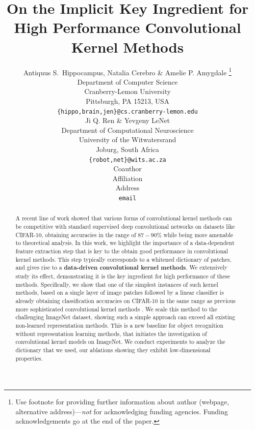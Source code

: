 \documentclass{article} %
\title{On the Implicit  Key Ingredient for High Performance Convolutional Kernel Methods}
\author{Antiquus S.~Hippocampus, Natalia Cerebro \& Amelie P. Amygdale \thanks{ Use footnote for providing further information
about author (webpage, alternative address)---\emph{not} for acknowledging
funding agencies.  Funding acknowledgements go at the end of the paper.} \\
Department of Computer Science\\
Cranberry-Lemon University\\
Pittsburgh, PA 15213, USA \\
\texttt{\{hippo,brain,jen\}@cs.cranberry-lemon.edu} \\
\And
Ji Q. Ren \& Yevgeny LeNet \\
Department of Computational Neuroscience \\
University of the Witwatersrand \\
Joburg, South Africa \\
\texttt{\{robot,net\}@wits.ac.za} \\
\AND
Coauthor \\
Affiliation \\
Address \\
\texttt{email}
}
\newcommand{\Edouard}[1]{\textcolor{blue}{#1}}
\begin{document}
\maketitle

\begin{abstract}
A recent line of work showed that  various forms of convolutional  kernel methods can be competitive with standard supervised deep convolutional networks on datasets like CIFAR-10, obtaining accuracies in the range of $87-90\%$ while being more amenable to theoretical analysis. 
In this work, we highlight the importance of a data-dependent feature extraction step that is key to the obtain good performance in convolutional kernel methods.
This step typically corresponds to a whitened dictionary of patches, and gives rise to a \textbf{data-driven convolutional kernel methods}.
We extensively study its effect,   
demonstrating it is the key ingredient for high performance of these methods.
Specifically, we show that
one of the simplest instances of such kernel methods,
based on a single layer of  image patches followed by a linear classifier is already obtaining classification accuracies on CIFAR-10 in the same range as previous more sophisticated convolutional kernel methods
.
We scale this method to the challenging ImageNet dataset, showing such a simple approach can exceed all existing non-learned representation methods. This is a new baseline for object recognition without representation learning methods, that  initiates the investigation of  convolutional kernel models  on ImageNet. 
We conduct experiments to analyze the dictionary that we used, our ablations showing they exhibit low-dimensional properties. 

 
\end{abstract}
\end{document}
